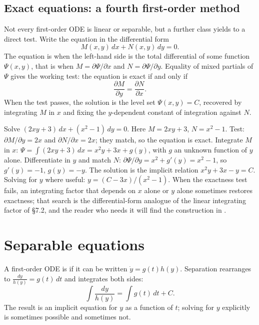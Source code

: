 

\subsection{Exact equations: a fourth first-order method}

Not every first-order ODE is linear or separable, but a further class
yields to a direct test. Write the equation in the differential form
\[
M(x, y)\,dx + N(x, y)\,dy = 0.
\]
The equation is  when the left-hand side is the total
differential of some function $\Psi(x, y)$, that is when
$M = \partial \Psi/\partial x$ and $N = \partial \Psi/\partial y$.
Equality of mixed partials of $\Psi$ gives the working test:
the equation is exact if and only if
\[
\frac{\partial M}{\partial y} = \frac{\partial N}{\partial x}.
\]
When the test passes, the solution is the level set $\Psi(x, y) = C$,
recovered by integrating $M$ in $x$ and fixing the $y$-dependent
constant of integration against $N$.

Solve $(2xy + 3)\,dx + (x^{2} - 1)\,dy = 0$. Here $M = 2xy + 3$,
$N = x^{2} - 1$. Test: $\partial M/\partial y = 2x$ and
$\partial N/\partial x = 2x$; they match, so the equation is exact.
Integrate $M$ in $x$: $\Psi = \int (2xy + 3)\,dx = x^{2} y + 3x +
g(y)$, with $g$ an unknown function of $y$ alone. Differentiate in
$y$ and match $N$: $\partial \Psi/\partial y = x^{2} + g'(y) = x^{2}
- 1$, so $g'(y) = -1$, $g(y) = -y$. The solution is the implicit
relation $x^{2} y + 3x - y = C$. Solving for $y$ where useful:
$y = (C - 3x)/(x^{2} - 1)$. When the exactness test fails, an
integrating factor that depends on $x$ alone or $y$ alone sometimes
restores exactness; that search is the differential-form analogue of
the linear integrating factor of \S7.2, and the reader who needs it
will find the construction in \textcite{text:boyce-diprima}.

\section{Separable equations}

A first-order ODE is  if it can be written
$\dot{y} = g(t) h(y)$. Separation rearranges to
$\frac{dy}{h(y)} = g(t)\,dt$ and integrates both sides:
\[
\int \frac{dy}{h(y)} = \int g(t)\,dt + C.
\]
The result is an implicit equation for $y$ as a function of $t$;
solving for $y$ explicitly is sometimes possible and sometimes not.

